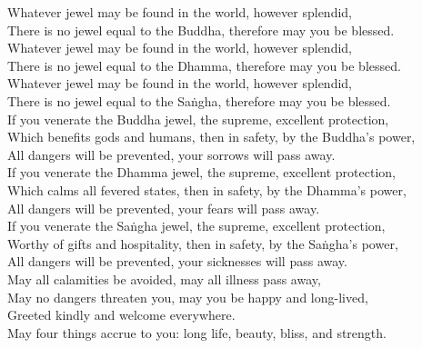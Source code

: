 \begin{onechants}
Whatever jewel may be found in the world, however splendid,\\
There is no jewel equal to the Buddha, therefore may you be blessed.\\
Whatever jewel may be found in the world, however splendid,\\
There is no jewel equal to the Dhamma, therefore may you be blessed.\\
Whatever jewel may be found in the world, however splendid,\\
There is no jewel equal to the Saṅgha, therefore may you be blessed.\\
If you venerate the Buddha jewel, the supreme, excellent protection,\\
Which benefits gods and humans, then in safety, by the Buddha's power,\\
All dangers will be prevented, your sorrows will pass away.\\
If you venerate the Dhamma jewel, the supreme, excellent protection,\\
Which calms all fevered states, then in safety, by the Dhamma's power,\\
All dangers will be prevented, your fears will pass away.\\
If you venerate the Saṅgha jewel, the supreme, excellent protection,\\
Worthy of gifts and hospitality, then in safety, by the Saṅgha's power,\\
All dangers will be prevented, your sicknesses will pass away.\\
May all calamities be avoided, may all illness pass away,\\
May no dangers threaten you, may you be happy and long-lived,\\
Greeted kindly and welcome everywhere.\\
May four things accrue to you: long life, beauty, bliss, and strength.\\
\end{onechants}

\clearpage

\paliText

